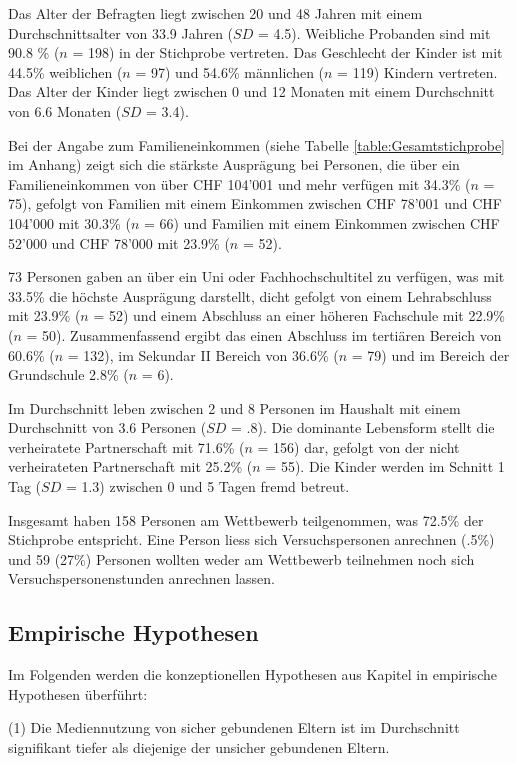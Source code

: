 Das Alter der Befragten liegt zwischen 20 und 48 Jahren mit einem Durchschnittsalter von 33.9 Jahren ($SD$ = 4.5). Weibliche Probanden sind mit 90.8 \% ($n$ = 198) in der Stichprobe vertreten. Das Geschlecht der Kinder ist mit 44.5\% weiblichen ($n$ = 97) und 54.6\% männlichen ($n$ = 119) Kindern vertreten. Das Alter der Kinder liegt zwischen 0 und 12 Monaten mit einem Durchschnitt von 6.6 Monaten ($SD$ = 3.4).

Bei der Angabe zum Familieneinkommen (siehe Tabelle \ref{table:Gesamtstichprobe} im Anhang) zeigt sich die stärkste Ausprägung bei Personen, die über ein Familieneinkommen von über CHF 104'001 und mehr verfügen mit 34.3\% ($n$ = 75), gefolgt von Familien mit einem Einkommen zwischen CHF 78'001 und CHF 104'000 mit 30.3\% ($n$ = 66) und Familien mit einem Einkommen zwischen CHF 52'000 und CHF 78'000 mit 23.9\% ($n$ = 52). 

73 Personen gaben an über ein Uni oder Fachhochschultitel zu verfügen, was mit 33.5\% die höchste Ausprägung darstellt, dicht gefolgt von einem Lehrabschluss mit 23.9\% ($n$ = 52) und einem Abschluss an einer höheren Fachschule mit 22.9\% ($n$ = 50). Zusammenfassend ergibt das einen Abschluss im tertiären Bereich von 60.6\% ($n$ = 132), im Sekundar II Bereich von 36.6\% ($n$ = 79) und im Bereich der Grundschule 2.8\% ($n$ = 6).

Im Durchschnitt leben zwischen 2 und 8 Personen im Haushalt mit einem Durchschnitt von 3.6 Personen ($SD$ = .8). Die dominante Lebensform stellt die verheiratete Partnerschaft mit 71.6\% ($n$ = 156) dar, gefolgt von der nicht verheirateten Partnerschaft mit 25.2\% ($n$ = 55). Die Kinder werden im Schnitt 1 Tag ($SD$ = 1.3)  zwischen 0 und 5 Tagen fremd betreut.

Insgesamt haben 158 Personen am Wettbewerb teilgenommen, was 72.5\% der Stichprobe entspricht. Eine Person liess sich Versuchspersonen anrechnen (.5\%) und 59 (27\%) Personen wollten weder am Wettbewerb teilnehmen noch sich Versuchspersonenstunden anrechnen lassen.



\subsection{Empirische Hypothesen}\label{sec:EmpirischeHypothesen}
Im Folgenden werden die konzeptionellen Hypothesen aus Kapitel \textit{} in empirische Hypothesen überführt:

(1) Die Mediennutzung von sicher gebundenen Eltern ist im Durchschnitt signifikant tiefer als diejenige der unsicher gebundenen Eltern.

